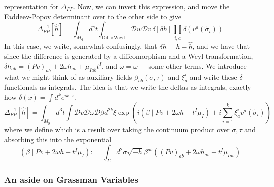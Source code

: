 \documentclass[11pt, oneside]{article}   	%
\theoremstyle{slanted}
\begin{document}
representation for $ \Delta _{ FP } $. 
Now, 
we can invert this expression, and move 
the Faddeev-Popov determinant 
over to the other side to give 
\[
 \Delta _{ FP } ^{ - 1 } \left[  \hat{ h }  \right]  
  = \int _{ M _ g } d ^ s t \int _{ \text{Diff} \times \text{Weyl}} \mathcal{ D } w 
  \mathcal{ D } v \, \delta \left[  \delta h  \right]  
  \prod_{ i , a } \delta \left( v ^ a \left( \tilde{ \sigma }_ i    \right)  \right) 
\] In this 
case, we write, somewhat confusingly, 
that $ \delta h  = h - \hat{h}$, and 
we have that since the difference 
is generated by a diffeomorphism 
and a Weyl transformation, $ \delta h _{ ab }  = \left( P v  \right)  _{ ab } 
+ 2 \overline{ \omega } h _{ ab } + \mu _{ I ab } t ^ I $, 
and $ \overline{ \omega }  = \omega  + $
some other terms. 
We 
introduce what we might think of as auxiliary fields 
$  \beta _{ ab } \left( \sigma, \tau  \right)    $ 
and $ \xi ^ i _ a $ and write these 
$ \delta $ functionals as integrals. 
The idea is that we write 
the deltas as integrals, exactly how 
$\delta \left( x  \right)  = \int d ^ k e ^{ i k \cdot  x } $. 
\[
\Delta ^{ - 1 } _{ FP } \left[  \hat{ h }  \right]  
= \int _{ M _g } d ^ 3 t \int \mathcal{ D } v \mathcal{ D } \omega 
\mathcal{ D } \beta d ^{ 2k } \xi \exp \left( i \left( 
\beta \mid P v + 2 \overline{ \omega } h + t ^ I \mu _ I \right)  + 
i \sum _{ i =  1} ^ k \xi ^ i _ a v ^ a \left( \tilde{ \sigma } _ i   \right) \right) 
\] where we define which is a
result over taking the continuum product 
over $ \sigma , \tau $ and absorbing this 
into the exponential 
\[
\left( \beta \mid P v + 2 \overline{ \omega  } h + t ^ I \mu _ I  \right) 
: = \int _{ \Sigma } d ^2 \sigma \sqrt{ - h }  \beta  ^{ ab } 
\left( \left( P v  \right)  _{ ab } + 2 \overline{ \omega  } h _{ab } + 
t ^ I \mu _{ I ab } \right) 
\] 

\subsubsection{An aside on Grassman 
Variables}
\end{document}
